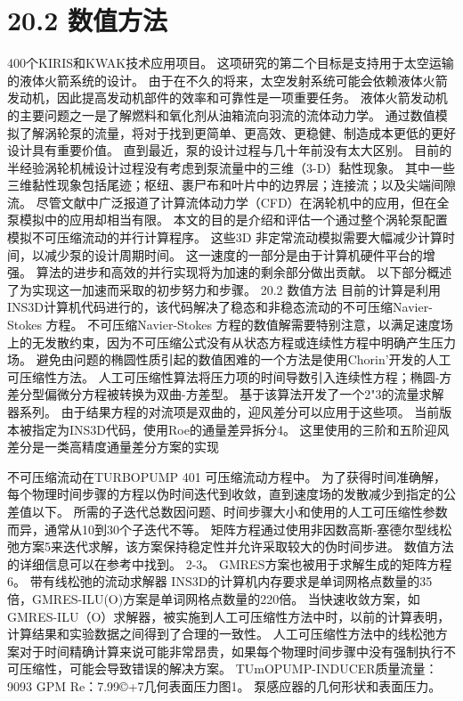 \documentclass[UTF8,11pt,a4paper,openany,fontset=fandol]{ctexbook}
\begin{document}
\section{20.2 数值方法}
400个KIRIS和KWAK技术应用项目。 这项研究的第二个目标是支持用于太空运输的液体火箭系统的设计。 由于在不久的将来，太空发射系统可能会依赖液体火箭发动机，因此提高发动机部件的效率和可靠性是一项重要任务。 液体火箭发动机的主要问题之一是了解燃料和氧化剂从油箱流向羽流的流体动力学。 通过数值模拟了解涡轮泵的流量，将对于找到更简单、更高效、更稳健、制造成本更低的更好设计具有重要价值。 直到最近，泵的设计过程与几十年前没有太大区别。 目前的半经验涡轮机械设计过程没有考虑到泵流量中的三维（3-D）黏性现象。 其中一些三维黏性现象包括尾迹；枢纽、裹尸布和叶片中的边界层；连接流；以及尖端间隙流。 尽管文献中广泛报道了计算流体动力学（CFD）在涡轮机中的应用，但在全泵模拟中的应用却相当有限。 本文的目的是介绍和评估一个通过整个涡轮泵配置模拟不可压缩流动的并行计算程序。 这些3D 非定常流动模拟需要大幅减少计算时间，以减少泵的设计周期时间。 这一速度的一部分是由于计算机硬件平台的增强。 算法的进步和高效的并行实现将为加速的剩余部分做出贡献。 以下部分概述了为实现这一加速而采取的初步努力和步骤。 20.2 数值方法 目前的计算是利用INS3D计算机代码进行的，该代码解决了稳态和非稳态流动的不可压缩Navier-Stokes 方程。 不可压缩Navier-Stokes 方程的数值解需要特别注意，以满足速度场上的无发散约束，因为不可压缩公式没有从状态方程或连续性方程中明确产生压力场。 避免由问题的椭圆性质引起的数值困难的一个方法是使用Chorin'开发的人工可压缩性方法。 人工可压缩性算法将压力项的时间导数引入连续性方程；椭圆-方差分型偏微分方程被转换为双曲-方差型。 基于该算法开发了一个2"3的流量求解器系列。 由于结果方程的对流项是双曲的，迎风差分可以应用于这些项。 当前版本被指定为INS3D代码，使用Roe的通量差异拆分4。 这里使用的三阶和五阶迎风差分是一类高精度通量差分方案的实现

不可压缩流动在TURBOPUMP 401 可压缩流动方程中。 为了获得时间准确解，每个物理时间步骤的方程以伪时间迭代到收敛，直到速度场的发散减少到指定的公差值以下。 所需的子迭代总数因问题、时间步骤大小和使用的人工可压缩性参数而异，通常从10到30个子迭代不等。 矩阵方程通过使用非因数高斯-塞德尔型线松弛方案5来迭代求解，该方案保持稳定性并允许采取较大的伪时间步进。 数值方法的详细信息可以在参考中找到。 2-3。 GMRES方案也被用于求解生成的矩阵方程6。 带有线松弛的流动求解器 INS3D的计算机内存要求是单词网格点数量的35倍，GMRES-ILU(O)方案是单词网格点数量的220倍。 当快速收敛方案，如GMRES-ILU（O）求解器，被实施到人工可压缩性方法中时，以前的计算表明，计算结果和实验数据之间得到了合理的一致性。 人工可压缩性方法中的线松弛方案对于时间精确计算来说可能非常昂贵，如果每个物理时间步骤中没有强制执行不可压缩性，可能会导致错误的解决方案。 TUmOPUMP-INDUCER质量流量：9093 GPM Re：7.99©+7几何表面压力图1。 泵感应器的几何形状和表面压力。
\end{document}
